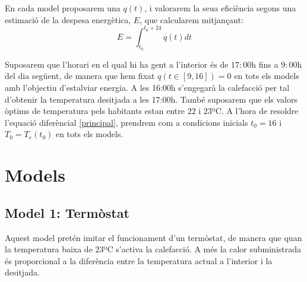 \documentclass[11pt]{article}
\begin{document}
En cada model proposarem una $q(t)$, i valorarem la seua eficiència segons una estimació de la despesa energètica, $E$, que calcularem mitjançant:\\
\begin{equation}\label{gasto}
	E=\int^{t_0+24}_{t_0} q(t)dt
\end{equation}

Suposarem que l'horari en el qual hi ha gent a l'interior és de $17:00$h fins a $9:00$h del dia següent, de manera que hem fixat $q(t\in[9,16])=0$ en tots els models amb l'objectiu d'estalviar energia. A les 16:00h s'engegarà la calefacció per tal d'obtenir la temperatura desitjada a les 17:00h. També suposarem que els valors òptims de temperatura pels habitants estan entre $22$ i $23$ºC. A l'hora de resoldre l'equació diferèncial \eqref{principal}, prendrem com a condicions inicials $t_0=16$ i $T_0=T_e(t_0)$ en tots els models.\\
\section*{Models}
	\subsection{Model 1: Termòstat}
	Aquest model pretén imitar el funcionament d'un termòstat, de manera que quan la temperatura baixa de $23$ºC s'activa la calefacció. A més la calor subministrada és proporcional a la diferència entre la temperatura actual a l'interior i la desitjada.
\end{document}
